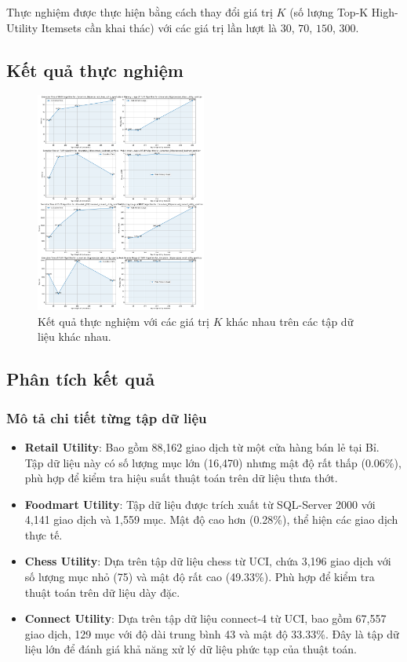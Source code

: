 \documentclass[conference]{IEEEtran}
\begin{document}
Thực nghiệm được thực hiện bằng cách thay đổi giá trị \(K\) (số lượng Top-K High-Utility Itemsets cần khai thác) với các giá trị lần lượt là \(30\), \(70\), \(150\), \(300\). 

\subsection{Kết quả thực nghiệm}

\begin{figure}[H]
    \centering
    \includegraphics[width=0.5\textwidth]{output.png}
    \caption{Kết quả thực nghiệm với các giá trị \(K\) khác nhau trên các tập dữ liệu khác nhau.}
    \label{fig:results}
\end{figure}

\subsection{Phân tích kết quả}


\subsubsection{Mô tả chi tiết từng tập dữ liệu}

\begin{itemize}
    \item \textbf{Retail Utility}: Bao gồm 88,162 giao dịch từ một cửa hàng bán lẻ tại Bỉ. Tập dữ liệu này có số lượng mục lớn (16,470) nhưng mật độ rất thấp (0.06\%), phù hợp để kiểm tra hiệu suất thuật toán trên dữ liệu thưa thớt.
    \item \textbf{Foodmart Utility}: Tập dữ liệu được trích xuất từ SQL-Server 2000 với 4,141 giao dịch và 1,559 mục. Mật độ cao hơn (0.28\%), thể hiện các giao dịch thực tế.
    \item \textbf{Chess Utility}: Dựa trên tập dữ liệu chess từ UCI, chứa 3,196 giao dịch với số lượng mục nhỏ (75) và mật độ rất cao (49.33\%). Phù hợp để kiểm tra thuật toán trên dữ liệu dày đặc.
    \item \textbf{Connect Utility}: Dựa trên tập dữ liệu connect-4 từ UCI, bao gồm 67,557 giao dịch, 129 mục với độ dài trung bình 43 và mật độ 33.33\%. Đây là tập dữ liệu lớn để đánh giá khả năng xử lý dữ liệu phức tạp của thuật toán.
\end{itemize}
\end{document}
